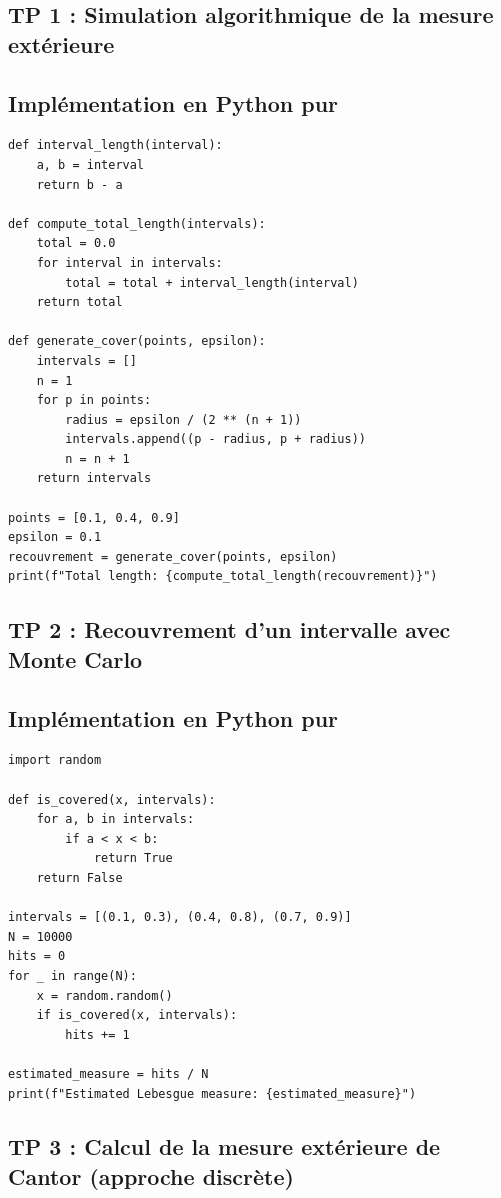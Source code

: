 \documentclass[11pt,a4paper]{article}
\begin{document}
\subsection*{TP 1 : Simulation algorithmique de la mesure extérieure}

\subsection*{Implémentation en Python pur}

\begin{lstlisting}
def interval_length(interval):
    a, b = interval
    return b - a

def compute_total_length(intervals):
    total = 0.0
    for interval in intervals:
        total = total + interval_length(interval)
    return total

def generate_cover(points, epsilon):
    intervals = []
    n = 1
    for p in points:
        radius = epsilon / (2 ** (n + 1))
        intervals.append((p - radius, p + radius))
        n = n + 1
    return intervals

points = [0.1, 0.4, 0.9]
epsilon = 0.1
recouvrement = generate_cover(points, epsilon)
print(f"Total length: {compute_total_length(recouvrement)}")
\end{lstlisting}


\subsection*{TP 2 : Recouvrement d'un intervalle avec Monte Carlo}

\subsection*{Implémentation en Python pur}

\begin{lstlisting}
import random

def is_covered(x, intervals):
    for a, b in intervals:
        if a < x < b:
            return True
    return False

intervals = [(0.1, 0.3), (0.4, 0.8), (0.7, 0.9)]
N = 10000
hits = 0
for _ in range(N):
    x = random.random()
    if is_covered(x, intervals):
        hits += 1

estimated_measure = hits / N
print(f"Estimated Lebesgue measure: {estimated_measure}")
\end{lstlisting}


\subsection*{TP 3 : Calcul de la mesure extérieure de Cantor (approche discrète)}
\end{document}
